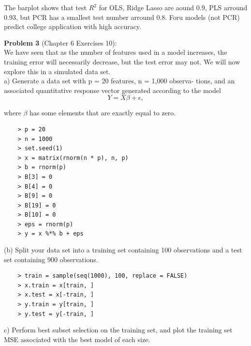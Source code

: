 \documentclass{article}
\begin{document}
The barplot shows that test $R^2$ for OLS, Ridge Lasso are aound 0.9, PLS arround 0.93, but PCR has a smallest test number  arround 0.8. Foru models (not PCR) predict college application with high accuracy.



\newpage

{\bf Problem 3} (Chapter 6 Exercises 10):\\


We have seen that as the number of features used in a model increases, the training error will necessarily decrease, but the test error may not. We will now explore this in a simulated data set.\\

a) Generate a data set with p = 20 features, n = 1,000 observa- tions, and an associated quantitative response vector generated according to the model
\begin{equation} 
	Y =X\beta + \epsilon,	
\end{equation}

where $\beta$ has some elements that are exactly equal to zero.

\begin{program}
	\begin{verbatim}
	> p = 20
	> n = 1000
	> set.seed(1)
	> x = matrix(rnorm(n * p), n, p)
	> b = rnorm(p)
	> B[3] = 0
	> B[4] = 0
	> B[9] = 0
	> B[19] = 0
	> B[10] = 0
	> eps = rnorm(p)
	> y = x %*% b + eps
	\end{verbatim}
\end{program}

(b) Split your data set into a training set containing 100 observations and a test set containing 900 observations.

\begin{program}
	\begin{verbatim}
	> train = sample(seq(1000), 100, replace = FALSE)
	> x.train = x[train, ]
	> x.test = x[-train, ]
	> y.train = y[train, ]
	> y.test = y[-train, ]
		\end{verbatim}
\end{program}

\newpage


c) Perform best subset selection on the training set, and plot the training set MSE associated with the best model of each size.
\end{document}
